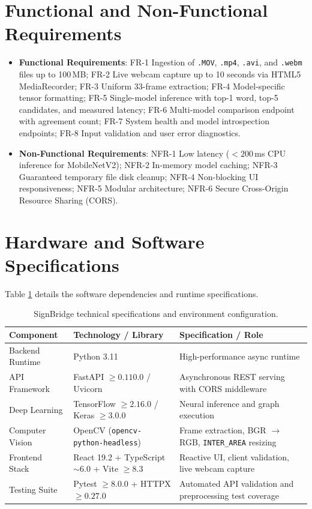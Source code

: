 \section{Functional and Non-Functional Requirements}
\label{sec:reqs}
\begin{itemize}
    \item \textbf{Functional Requirements}: FR-1 Ingestion of \texttt{.MOV}, \texttt{.mp4}, \texttt{.avi}, and \texttt{.webm} files up to 100\,MB; FR-2 Live webcam capture up to 10 seconds via HTML5 MediaRecorder; FR-3 Uniform 33-frame extraction; FR-4 Model-specific tensor formatting; FR-5 Single-model inference with top-1 word, top-5 candidates, and measured latency; FR-6 Multi-model comparison endpoint with agreement count; FR-7 System health and model introspection endpoints; FR-8 Input validation and user error diagnostics.
    \item \textbf{Non-Functional Requirements}: NFR-1 Low latency ($<200$\,ms CPU inference for MobileNetV2); NFR-2 In-memory model caching; NFR-3 Guaranteed temporary file disk cleanup; NFR-4 Non-blocking UI responsiveness; NFR-5 Modular architecture; NFR-6 Secure Cross-Origin Resource Sharing (CORS).
\end{itemize}

\section{Hardware and Software Specifications}
\label{sec:hw_sw}
Table \ref{tab:tech_stack} details the software dependencies and runtime specifications.

\begin{table}[htbp]
\centering
\caption{SignBridge technical specifications and environment configuration.}
\label{tab:tech_stack}
\scriptsize
\begin{tabularx}{\textwidth}{l l X}
\toprule
\textbf{Component} & \textbf{Technology / Library} & \textbf{Specification / Role} \\
\midrule
Backend Runtime & Python 3.11 & High-performance async runtime \\
API Framework & FastAPI $\ge 0.110.0$ / Uvicorn & Asynchronous REST serving with CORS middleware \\
Deep Learning & TensorFlow $\ge 2.16.0$ / Keras $\ge 3.0.0$ & Neural inference and graph execution \\
Computer Vision & OpenCV (\texttt{opencv-python-headless}) & Frame extraction, BGR $\to$ RGB, \texttt{INTER\_AREA} resizing \\
Frontend Stack & React 19.2 + TypeScript $\sim 6.0$ + Vite $\ge 8.3$ & Reactive UI, client validation, live webcam capture \\
Testing Suite & Pytest $\ge 8.0.0$ + HTTPX $\ge 0.27.0$ & Automated API validation and preprocessing test coverage \\
\bottomrule
\end{tabularx}
\end{table}

